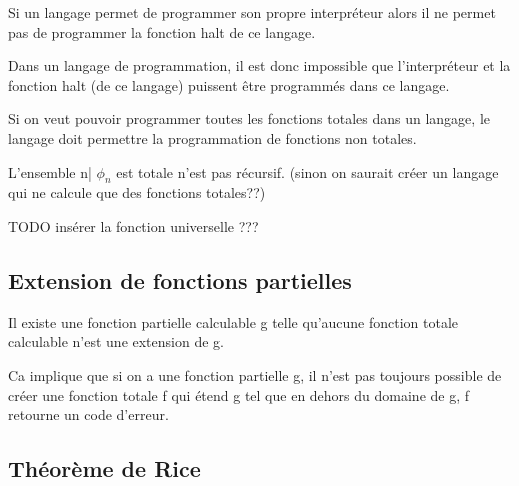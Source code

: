 \begin{myprop}
	Si un langage permet de programmer son propre interpréteur alors il ne permet 
	pas de programmer la fonction halt de ce langage.
\end{myprop}

\begin{myprop}
	Dans un langage de programmation, il est donc impossible que 
	l'interpréteur et la fonction halt (de ce langage) puissent être programmés dans ce langage.
\end{myprop}

\begin{myprop}
	Si on veut pouvoir programmer toutes les fonctions 
	totales dans un langage, le langage doit permettre la programmation de 
	fonctions non totales.
\end{myprop}

\begin{myprop}
	L'ensemble {n| $\phi_n$ est totale} n'est pas récursif. (sinon on 
	saurait créer un langage qui ne calcule que des fonctions totales??)
\end{myprop}

TODO insérer la fonction universelle ???


\subsection{Extension de fonctions partielles}
\label{sub:extension_de_fonctions_partielles}

\begin{mytheo}
	Il existe une fonction partielle calculable g telle 
	qu'aucune fonction totale calculable n'est une extension de g.
\end{mytheo}

\begin{myrem}
	Ca implique que si on a une fonction partielle g, il n'est pas 
	toujours possible de créer une fonction totale f qui étend g
	tel que en dehors du domaine de g, f retourne un code d'erreur.
\end{myrem}
	

\subsection{Théorème de Rice}
\label{sub:th_or_me_de_rice}

